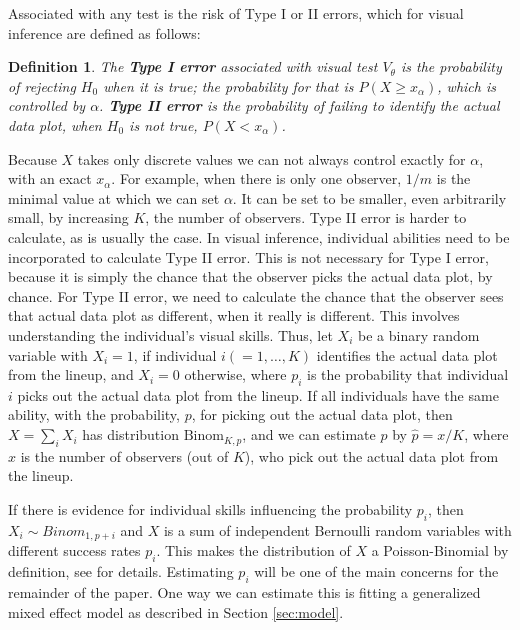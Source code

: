 \documentclass{article}
\newcommand{\green}[1]{{\color{green} #1}} %
\newcommand{\hh}[1]{{\color{orange} #1}} %
\newtheorem{dfn}{Definition}[section]
\begin{document}
\noindent
Associated with any test is the risk of  Type I or II errors, which for visual inference are defined as follows: 

\begin{dfn}\label{dfn:error}
The \textbf{Type I error} associated with visual test $V_{\theta}$ is the probability of rejecting $H_0$ when it is true; the probability for that is $P(X \ge x_{\alpha})$, which is controlled by $\alpha$.
\textbf{Type II error} is the probability of failing to identify the actual data plot, when $H_0$ is not true, $P( X <  x_{\alpha})$.
\end{dfn}


\noindent Because $X$ takes only discrete values we can not always control exactly for $\alpha$, with an exact $x_{\alpha}$. For example, when there is only one observer, $1/m$ is the minimal value at which we can set $\alpha$. It can be set to be smaller, even arbitrarily small, by increasing $K$, the number of observers. 
Type II error is harder to calculate, as is usually the case. In visual inference, individual abilities need to be incorporated to calculate Type II error. This is not necessary for Type I error, because it is simply the chance that the observer picks the actual data plot, by chance. For Type II error, we need to calculate the chance that the observer sees that actual data plot as different, when it really is different. This involves understanding the individual's visual skills. Thus, let $X_i$ be a binary random variable with $X_i = 1$, if individual $i (=1, \dots , K)$ identifies the actual data plot from the lineup, and $X_i = 0$ otherwise, where $p_i$ is the probability that individual $i$ picks out the actual data plot from the lineup. If all individuals have the same ability, with the probability, $p$, for picking out the actual data plot, then $X = \sum_i X_i$ has distribution $\text{Binom}_{K, p}$, and we can estimate $p$ by $\hat{p} = x/K$, where $x$ is the number of observers (out of $K$), who pick out the actual data plot from the lineup. 

\hh{If there is evidence for individual skills influencing the probability $p_i$, then $X_i \sim Binom_{1, p+i}$ and $X$ is a sum of independent Bernoulli random variables with different success rates $p_i$. This makes the distribution of $X$ a Poisson-Binomial by definition, see \citet{butler93} for details. Estimating $p_i$ will be one of the main concerns for the remainder of the paper.} One way we can estimate this is fitting a generalized mixed effect model as described in Section \ref{sec:model}.
\end{document}

